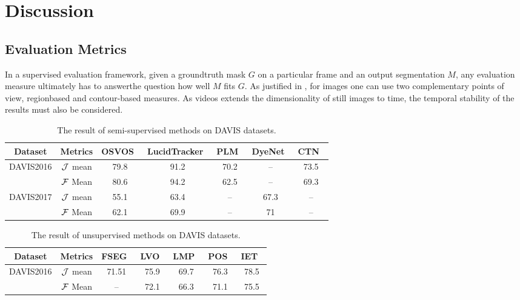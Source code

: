 \section{Discussion}

\subsection{Evaluation Metrics}
In a supervised evaluation framework, given a groundtruth mask $G$ on a particular frame and an output segmentation $M$,
any evaluation measure ultimately has to answerthe question how well $M$ fits $G$. As justified in \cite{pont2016supervised}, 
for images one can use two complementary points of view, regionbased and contour-based measures. As videos extends the
dimensionality of still images to time, the temporal stability of the results must also be considered.


\begin{table*}[ht]
	\begin{center}
		\setlength\tabcolsep{3pt}
		\begin{tabular}{|c|c|c|c|c|c|c|}
		\hline
Dataset& Metrics &OSVOS~\cite{OSVOS}  &LucidTracker~\cite{LucidTracker} &PLM~\cite{PLM} & DyeNet~\cite{DyeNet} &CTN~\cite{CTN}\\
\hline
\multirow{2}{*}{DAVIS2016} &$\mathcal{J}$ mean  &79.8   &91.2     &70.2      &--    &73.5\\
\cline{2-7}
&$\mathcal{F}$ Mean      &80.6    &94.2  &62.5  &--  &69.3\\
\hline
\multirow{2}{*}{DAVIS2017} &$\mathcal{J}$ mean  &55.1   &63.4     &--      &67.3    &--\\
\cline{2-7}
&$\mathcal{F}$ Mean      &62.1    &69.9  &--        &71      &--\\
\hline
\end{tabular}
\end{center}
\caption{The result of semi-supervised methods on DAVIS datasets.}
\label{table:semisuperivsed_all_dataset}
\end{table*}


\begin{table*}[ht]
	\begin{center}
		\setlength\tabcolsep{3pt}
		\begin{tabular}{|c|c|c|c|c|c|c|}
		\hline
Dataset& Metrics &FSEG~\cite{Jain2017FusionSeg}  &LVO~\cite{Tokmakov2017Learning} &LMP~\cite{Tokmakov2017Learning} & POS~\cite{Koh2017Primary} &IET~\cite{li2018instance}\\
\hline
\multirow{2}{*}{DAVIS2016} &$\mathcal{J}$ mean  &71.51   &75.9     &69.7       &76.3    &78.5\\
\cline{2-7}
&$\mathcal{F}$ Mean      &   --    &72.1  &66.3        &71.1      &75.5\\
\hline
\end{tabular}
\end{center}
\caption{The result of unsupervised methods on DAVIS datasets.}
\label{table:unsuperivsed_all_dataset}
\end{table*}




